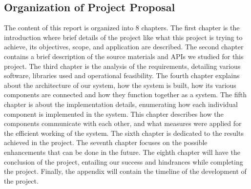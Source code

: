 \subsection{Organization of Project Proposal}
The content of this report is organized into 8 chapters. The first chapter is the introduction where brief details of the project like what this project is trying to achieve, its objectives, scope, and application are described. The second chapter contains a brief
description of the source materials and APIs we studied for this project. The third chapter is the analysis of the requirements, detailing various software, libraries used and operational feasibility. The fourth chapter explains about the architecture of our system, how the system is built, how its various components are connected and how they function together as a system. The fifth chapter is about the implementation details, enumerating how each individual component is implemented in the system. This
chapter describes how the components communicate with each other, and what measures were applied for the efficient working of the system. The sixth chapter is dedicated to the results achieved in the project. The seventh chapter focuses on the possible enhancements that can be done in the future. The eighth chapter will have the conclusion of the project, entailing our success and hindrances while completing the project. Finally, the appendix will contain the timeline of the development of the project.
